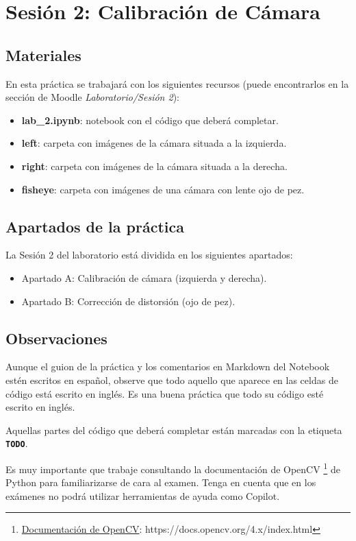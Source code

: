 \chapter{Sesión 2: Calibración de Cámara}
\label{chapter:introduction_ses_2}

\section{Materiales}
En esta práctica se trabajará con los siguientes recursos (puede encontrarlos en la sección de Moodle \textit{Laboratorio/Sesión 2}):

\begin{itemize}
    \item \textbf{lab\_2.ipynb}: notebook con el código que deberá completar.
    \item \textbf{left}: carpeta con imágenes de la cámara situada a la izquierda.
    \item \textbf{right}: carpeta con imágenes de la cámara situada a la derecha.
    \item \textbf{fisheye}: carpeta con imágenes de una cámara con lente ojo de pez.
\end{itemize}

\section{Apartados de la práctica}
La Sesión 2 del laboratorio está dividida en los siguientes apartados:

\begin{itemize}
    \item Apartado A: Calibración de cámara (izquierda y derecha).
    \item Apartado B:  Corrección de distorsión (ojo de pez).
\end{itemize}

\section{Observaciones}
Aunque el guion de la práctica y los comentarios en Markdown del Notebook estén escritos en español, observe que todo aquello que aparece en las celdas de código está escrito en inglés. Es una buena práctica que todo su código esté escrito en inglés.

Aquellas partes del código que deberá completar están marcadas con la etiqueta \textbf{\texttt{TODO}}.

Es muy importante que trabaje consultando la documentación de OpenCV \footnote{\href{https://docs.opencv.org/4.x/index.html}{Documentación de OpenCV}: https://docs.opencv.org/4.x/index.html} de Python para familiarizarse de cara al examen. Tenga en cuenta que en los exámenes no podrá utilizar herramientas de ayuda como Copilot.

